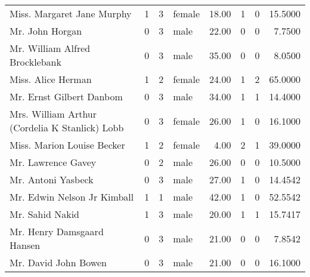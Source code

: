 \begin{tabular}{lrrlrrrr}
Miss. Margaret Jane Murphy                         &         1 &       3 &  female &  18.00 &                        1 &                        0 &   15.5000 \\
Mr. John Horgan                                    &         0 &       3 &    male &  22.00 &                        0 &                        0 &    7.7500 \\
Mr. William Alfred Brocklebank                     &         0 &       3 &    male &  35.00 &                        0 &                        0 &    8.0500 \\
Miss. Alice Herman                                 &         1 &       2 &  female &  24.00 &                        1 &                        2 &   65.0000 \\
Mr. Ernst Gilbert Danbom                           &         0 &       3 &    male &  34.00 &                        1 &                        1 &   14.4000 \\
Mrs. William Arthur (Cordelia K Stanlick) Lobb     &         0 &       3 &  female &  26.00 &                        1 &                        0 &   16.1000 \\
Miss. Marion Louise Becker                         &         1 &       2 &  female &   4.00 &                        2 &                        1 &   39.0000 \\
Mr. Lawrence Gavey                                 &         0 &       2 &    male &  26.00 &                        0 &                        0 &   10.5000 \\
Mr. Antoni Yasbeck                                 &         0 &       3 &    male &  27.00 &                        1 &                        0 &   14.4542 \\
Mr. Edwin Nelson Jr Kimball                        &         1 &       1 &    male &  42.00 &                        1 &                        0 &   52.5542 \\
Mr. Sahid Nakid                                    &         1 &       3 &    male &  20.00 &                        1 &                        1 &   15.7417 \\
Mr. Henry Damsgaard Hansen                         &         0 &       3 &    male &  21.00 &                        0 &                        0 &    7.8542 \\
Mr. David John Bowen                               &         0 &       3 &    male &  21.00 &                        0 &                        0 &   16.1000 \\

\end{tabular}
